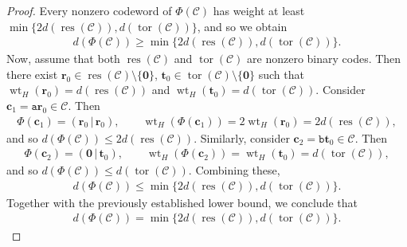 \documentclass[12pt]{article}
\theoremstyle{definition}
\theoremstyle{plain}
\begin{document}
\begin{proof}
Every nonzero codeword of $\Phi(\mathcal{C})$ has weight at least $\min  \{ 2 d( \operatorname{res} ( \mathcal{C} ) )  , d( \operatorname{tor} ( \mathcal{C} ) )  \}$, and so we obtain
\begin{align*}
d( \Phi(\mathcal{C} ) )  \ge  \min  \{ 2 d( \operatorname{res} ( \mathcal{C} ) )  , d( \operatorname{tor} ( \mathcal{C} ) )  \}  .
\end{align*}
Now, assume that both $ \operatorname{res} (\mathcal{C}) $ and $ \operatorname{tor} (\mathcal{C}) $ are nonzero binary codes. Then there exist $ \mathbf{r} _0 \in \operatorname{res} (\mathcal{C}) \setminus \{ \mathbf{0} \}$,  $  \mathbf{t}_0 \in \operatorname{tor} (\mathcal{C}) \setminus\{ \mathbf{0} \}$ such that $\operatorname{wt}_H ( \mathbf{r} _0 ) = d ( \operatorname{res} (\mathcal{C}) )$ and $\operatorname{wt}_H (  \mathbf{t}_0 ) = d ( \operatorname{tor} (\mathcal{C}) )$. Consider $ \mathbf{c}_1 = \mathtt{a}  \mathbf{r} _0 \in \mathcal{C}$. Then
\begin{align*}
\Phi( \mathbf{c}_1) = ( \mathbf{r} _0 \, | \, \mathbf{r} _0), \qquad
\operatorname{wt}_H ( \Phi( \mathbf{c}_1 ) ) = 2 \operatorname{wt}_H ( \mathbf{r} _0) = 2 d ( \operatorname{res} (\mathcal{C}) )  ,
\end{align*}
and so
$
d(\Phi(\mathcal{C})) \le 2 d( \operatorname{res} (\mathcal{C}) )
$.
Similarly, consider $ \mathbf{c}_2 = \mathtt{b}  \mathbf{t}_0 \in \mathcal{C}$. Then
\begin{align*}
\Phi( \mathbf{c}_2) = ( \mathbf{0}  \, | \, \mathbf{t}_0 ) , \qquad
\operatorname{wt}_H (\Phi( \mathbf{c}_2)) = \operatorname{wt}_H (  \mathbf{t}_0) = d( \operatorname{tor} (\mathcal{C}) ) ,
\end{align*}
and so
$
d(\Phi(\mathcal{C})) \le d( \operatorname{tor} (\mathcal{C}) )
$.
Combining these,
\begin{align*}
d(\Phi(\mathcal{C})) \leq  \min\{2 d(\operatorname{res}(\mathcal{C})), d(\operatorname{tor}(\mathcal{C}))\}  .
\end{align*}
Together with the previously established lower bound, we conclude that
\begin{align*}
d(\Phi(\mathcal{C})) =  \min\{2 d(\operatorname{res}(\mathcal{C})), d(\operatorname{tor}(\mathcal{C}))\} .  \tag*{\qedhere}
\end{align*}
\renewcommand{\qedsymbol}{}
\end{proof}
\end{document}
